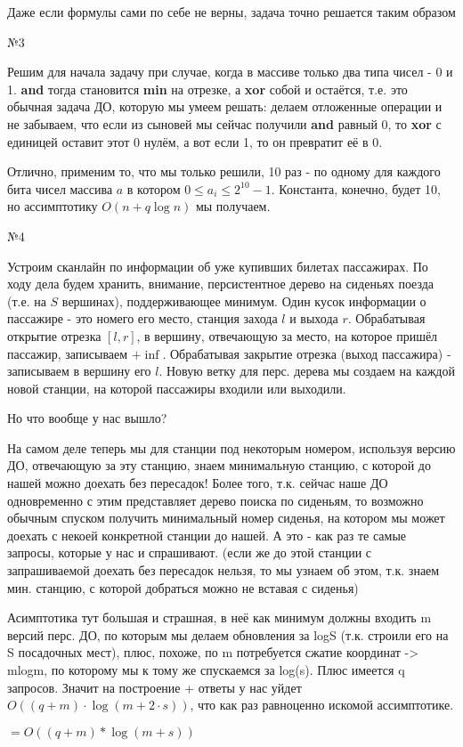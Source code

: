 \documentclass{article}
\begin{document}
Даже если формулы сами по себе не верны, задача точно решается таким образом

\begin{center}
\huge №3
\end{center}

Решим для начала задачу при случае, когда в массиве только два типа чисел - 0 и 1. \textbf{and} тогда становится \textbf{min} на отрезке, а \textbf{xor} собой и остаётся, т.е. это обычная задача ДО, которую мы умеем решать: делаем отложенные операции и не забываем, что если из сыновей мы сейчас получили \textbf{and} равный 0, то \textbf{xor} с единицей оставит этот 0 нулём, а вот если 1, то он превратит её в 0.

Отлично, применим то, что мы только решили, 10 раз - по одному для каждого бита чисел массива $a$ в котором $0 \leq a_i \leq 2^{10}-1$. Константа, конечно, будет 10, но ассимптотику $O(n + q \log n)$ мы получаем.

\begin{center}
\huge №4
\end{center}

Устроим сканлайн по информации об уже купивших билетах пассажирах. По ходу дела будем хранить, внимание, персистентное дерево на сиденьях поезда (т.е. на $S$ вершинах), поддерживающее минимум. Один кусок информации о пассажире - это номего его место, станция захода $l$ и выхода $r$. Обрабатывая открытие отрезка $[l, r]$, в вершину, отвечающую за место, на которое пришёл пассажир, записываем $+\inf$. Обрабатывая закрытие отрезка (выход пассажира) - записываем в вершину его $l$. Новую ветку для перс. дерева мы создаем на каждой новой станции, на которой пассажиры входили или выходили.

Но что вообще у нас вышло?

На самом деле теперь мы для станции под некоторым номером, используя версию ДО, отвечающую за эту станцию, знаем минимальную станцию, с которой до нашей можно доехать без пересадок! Более того, т.к. сейчас наше ДО одновременно с этим представляет дерево поиска по сиденьям, то возможно обычным спуском получить минимальный номер сиденья, на котором мы может доехать с некоей конкретной станции до нашей. А это - как раз те самые запросы, которые у нас и спрашивают. (если же до этой станции с запрашиваемой доехать без пересадок нельзя, то мы узнаем об этом, т.к. знаем мин. станцию, с которой добраться можно не вставая с сиденья)

Асимптотика тут большая и страшная, в неё как минимум должны входить m версий перс. ДО, по которым мы делаем обновления за logS (т.к. строили его на S посадочных мест), плюс, похоже, по m потребуется сжатие координат -> mlogm, по которому мы к тому же спускаемся за log(s). Плюс имеется q запросов. Значит на построение + ответы у нас уйдет $O\left( (q + m) \cdot \log (m + 2 \cdot s) \right)$, что как раз равноценно искомой ассимптотике.

$= O\left( (q + m) * \log (m + s) \right)$
\end{document}
